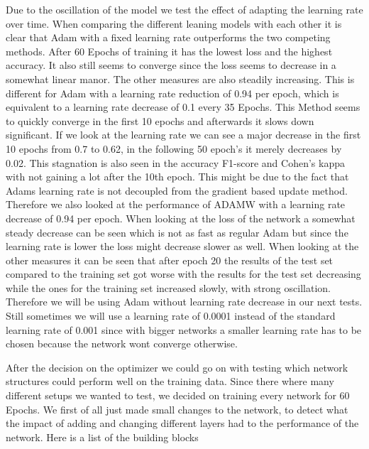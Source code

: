 \documentclass[
a4paper, 
12pt,
grayscalebody, %
abstract=on,
twoside, BCOR10mm, 12pt, DIV13,headinclude, footexclude, final, abstracton, openright
]{ibireprt}
\numberwithin{equation}{chapter}
\numberwithin{table}{chapter}
\numberwithin{figure}{chapter}
\numberwithin{algorithm}{chapter}
\numberwithin{example}{chapter}
\numberwithin{example}{chapter}
\begin{document}
\clearpage
Due to the oscillation of the model we test the effect of adapting the learning rate over time. When comparing the different leaning models with each other it is clear that Adam with a fixed learning rate outperforms the two competing methods. After 60 Epochs of training it has the lowest loss and the highest accuracy. It also still seems to converge since the loss seems to decrease in a somewhat linear manor. The other measures are also steadily increasing. This is different for Adam with a learning rate reduction of 0.94 per epoch, which is equivalent to a learning rate decrease of 0.1 every 35 Epochs. This Method seems to quickly converge in the first 10 epochs and afterwards it slows down significant. If we look at the learning rate we can see a major decrease in the first 10 epochs from 0.7 to 0.62, in the following 50 epoch's it merely decreases by 0.02. This stagnation is also seen in the accuracy F1-score and Cohen's kappa with not gaining a lot after the 10th epoch. This might be due to the fact that Adams learning rate is not decoupled from the gradient based update method. Therefore we also looked at the performance of ADAMW with a learning rate decrease of 0.94 per epoch. When looking at the loss of the network a somewhat steady decrease can be seen which is not as fast as regular Adam but since the learning rate is lower the loss might decrease slower as well. When looking at the other measures it can be  seen that after epoch 20 the results of the test set compared to the training set got worse with the results for the test set decreasing while the ones for the training set increased slowly, with strong oscillation. Therefore we will be using Adam without learning rate decrease in our next tests. Still sometimes we will use a learning rate of 0.0001 instead of the standard learning rate of 0.001 since with bigger networks a smaller learning rate has to be chosen because the network wont converge otherwise.



After the decision on the optimizer we could go on with testing which network structures could perform well on the training data. Since there where many different setups we wanted to test, we decided on training every network for 60 Epochs. We first of all just made small changes to the network, to detect what the impact of adding and changing different layers had to the performance of the network. Here is a list of the building blocks
\end{document}
